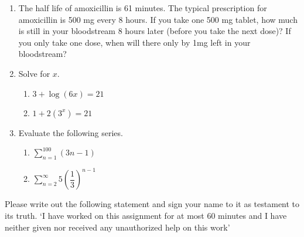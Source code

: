 \documentclass[12pt]{article}
\theoremstyle{plain}     %
\begin{document}
\begin{enumerate}
\begin{enumerate}
			\end{enumerate}
		\item The half life of amoxicillin is 61 minutes. The typical prescription for amoxicillin is 500 mg every 8 hours. If you take one 500 mg tablet, how much is still in your bloodstream 8 hours later (before you take the next dose)? If you only take one dose, when will there only by 1mg left in your bloodstream?\\[8cm]
		\item Solve for $x$.
			\begin{enumerate}
				\item $3+\log(6x)=21$\\[5cm]
				\item $1+2(3^x)=21$\\[5cm]
				
			\end{enumerate}
		\item Evaluate the following series.
			\begin{enumerate}
				\item $\displaystyle \sum_{n=1}^{100}(3n-1)$\\[6cm]
				\item $\displaystyle \sum_{n=2}^{\infty} 5\left(\dfrac{1}{3}\right)^{n-1}$
			\end{enumerate}
\end{enumerate}
\newpage
Please write out the following statement and sign your name to it as testament to its truth. `I have worked on this assignment for at most 60 minutes and I have neither given nor received any unauthorized help on this work'
	
\end{document}
